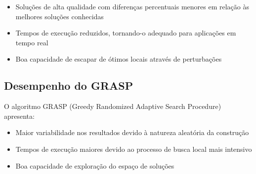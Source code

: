 \documentclass[12pt,a4paper]{article}
\begin{document}
\begin{itemize}
    \item Soluções de alta qualidade com diferenças percentuais menores em relação às melhores soluções conhecidas
    \item Tempos de execução reduzidos, tornando-o adequado para aplicações em tempo real
    \item Boa capacidade de escapar de ótimos locais através de perturbações
\end{itemize}

\subsection{Desempenho do GRASP}

O algoritmo GRASP (Greedy Randomized Adaptive Search Procedure) apresenta:

\begin{itemize}
    \item Maior variabilidade nos resultados devido à natureza aleatória da construção
    \item Tempos de execução maiores devido ao processo de busca local mais intensivo
    \item Boa capacidade de exploração do espaço de soluções
\end{itemize}
\end{document}
